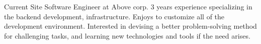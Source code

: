 

\begin{cvparagraph}

Current Site Software Engineer at Above corp. 3 years experience specializing in the backend development, infrastructure. Enjoys to customize all of the development environment. Interested in devising a better problem-solving method for challenging tasks, and learning new technologies and tools if the need arises.
\end{cvparagraph}
